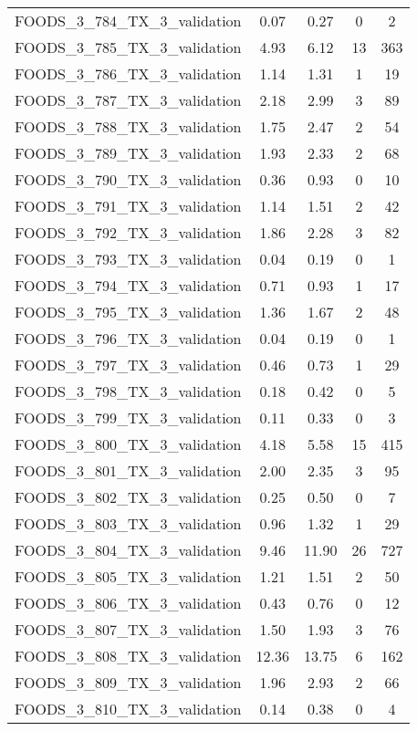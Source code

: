 \begin{table}
\begin{tabular}{|l|c|c|c|c|}
FOODS\_3\_784\_TX\_3\_validation & 0.07 & 0.27 & 0 & 2 \\
FOODS\_3\_785\_TX\_3\_validation & 4.93 & 6.12 & 13 & 363 \\
FOODS\_3\_786\_TX\_3\_validation & 1.14 & 1.31 & 1 & 19 \\
FOODS\_3\_787\_TX\_3\_validation & 2.18 & 2.99 & 3 & 89 \\
FOODS\_3\_788\_TX\_3\_validation & 1.75 & 2.47 & 2 & 54 \\
FOODS\_3\_789\_TX\_3\_validation & 1.93 & 2.33 & 2 & 68 \\
FOODS\_3\_790\_TX\_3\_validation & 0.36 & 0.93 & 0 & 10 \\
FOODS\_3\_791\_TX\_3\_validation & 1.14 & 1.51 & 2 & 42 \\
FOODS\_3\_792\_TX\_3\_validation & 1.86 & 2.28 & 3 & 82 \\
FOODS\_3\_793\_TX\_3\_validation & 0.04 & 0.19 & 0 & 1 \\
FOODS\_3\_794\_TX\_3\_validation & 0.71 & 0.93 & 1 & 17 \\
FOODS\_3\_795\_TX\_3\_validation & 1.36 & 1.67 & 2 & 48 \\
FOODS\_3\_796\_TX\_3\_validation & 0.04 & 0.19 & 0 & 1 \\
FOODS\_3\_797\_TX\_3\_validation & 0.46 & 0.73 & 1 & 29 \\
FOODS\_3\_798\_TX\_3\_validation & 0.18 & 0.42 & 0 & 5 \\
FOODS\_3\_799\_TX\_3\_validation & 0.11 & 0.33 & 0 & 3 \\
FOODS\_3\_800\_TX\_3\_validation & 4.18 & 5.58 & 15 & 415 \\
FOODS\_3\_801\_TX\_3\_validation & 2.00 & 2.35 & 3 & 95 \\
FOODS\_3\_802\_TX\_3\_validation & 0.25 & 0.50 & 0 & 7 \\
FOODS\_3\_803\_TX\_3\_validation & 0.96 & 1.32 & 1 & 29 \\
FOODS\_3\_804\_TX\_3\_validation & 9.46 & 11.90 & 26 & 727 \\
FOODS\_3\_805\_TX\_3\_validation & 1.21 & 1.51 & 2 & 50 \\
FOODS\_3\_806\_TX\_3\_validation & 0.43 & 0.76 & 0 & 12 \\
FOODS\_3\_807\_TX\_3\_validation & 1.50 & 1.93 & 3 & 76 \\
FOODS\_3\_808\_TX\_3\_validation & 12.36 & 13.75 & 6 & 162 \\
FOODS\_3\_809\_TX\_3\_validation & 1.96 & 2.93 & 2 & 66 \\
FOODS\_3\_810\_TX\_3\_validation & 0.14 & 0.38 & 0 & 4 \\

\end{tabular}
\end{table}
